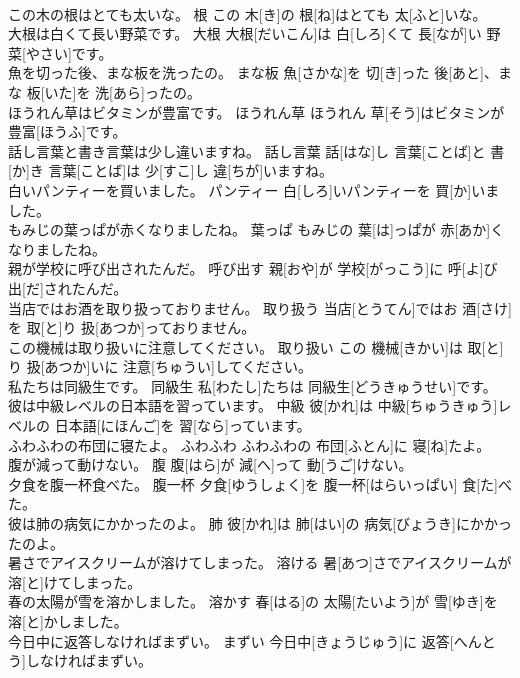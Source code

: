 \documentclass[8pt]{extreport}
\begin{document}
\begin{CJK}{UTF8}{min}
\\	この木の根はとても太いな。	根	この 木[き]の 根[ね]はとても 太[ふと]いな。	
\\	大根は白くて長い野菜です。	大根	大根[だいこん]は 白[しろ]くて 長[なが]い 野菜[やさい]です。	
\\	魚を切った後、まな板を洗ったの。	まな板	魚[さかな]を 切[き]った 後[あと]、まな 板[いた]を 洗[あら]ったの。	
\\	ほうれん草はビタミンが豊富です。	ほうれん草	ほうれん 草[そう]はビタミンが 豊富[ほうふ]です。	
\\	話し言葉と書き言葉は少し違いますね。	話し言葉	話[はな]し 言葉[ことば]と 書[か]き 言葉[ことば]は 少[すこ]し 違[ちが]いますね。	
\\	白いパンティーを買いました。	パンティー	白[しろ]いパンティーを 買[か]いました。	
\\	もみじの葉っぱが赤くなりましたね。	葉っぱ	もみじの 葉[は]っぱが 赤[あか]くなりましたね。	
\\	親が学校に呼び出されたんだ。	呼び出す	親[おや]が 学校[がっこう]に 呼[よ]び 出[だ]されたんだ。	
\\	当店ではお酒を取り扱っておりません。	取り扱う	当店[とうてん]ではお 酒[さけ]を 取[と]り 扱[あつか]っておりません。	
\\	この機械は取り扱いに注意してください。	取り扱い	この 機械[きかい]は 取[と]り 扱[あつか]いに 注意[ちゅうい]してください。	
\\	私たちは同級生です。	同級生	私[わたし]たちは 同級生[どうきゅうせい]です。	
\\	彼は中級レベルの日本語を習っています。	中級	彼[かれ]は 中級[ちゅうきゅう]レベルの 日本語[にほんご]を 習[なら]っています。	
\\	ふわふわの布団に寝たよ。	ふわふわ	ふわふわの 布団[ふとん]に 寝[ね]たよ。	
\\	腹が減って動けない。	腹	腹[はら]が 減[へ]って 動[うご]けない。	
\\	夕食を腹一杯食べた。	腹一杯	夕食[ゆうしょく]を 腹一杯[はらいっぱい] 食[た]べた。	
\\	彼は肺の病気にかかったのよ。	肺	彼[かれ]は 肺[はい]の 病気[びょうき]にかかったのよ。	
\\	暑さでアイスクリームが溶けてしまった。	溶ける	暑[あつ]さでアイスクリームが 溶[と]けてしまった。	
\\	春の太陽が雪を溶かしました。	溶かす	春[はる]の 太陽[たいよう]が 雪[ゆき]を 溶[と]かしました。	
\\	今日中に返答しなければまずい。	まずい	今日中[きょうじゅう]に 返答[へんとう]しなければまずい。	

\end{CJK}
\end{document}
